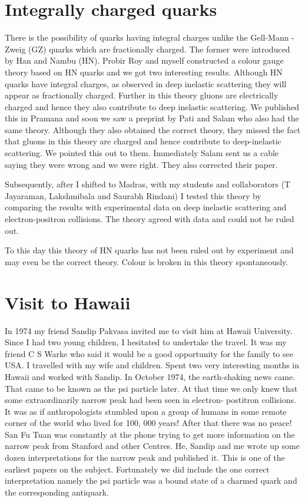 \section*{Integrally charged quarks}

There is the possibility of quarks having integral charges unlike the 
Gell-Mann - Zweig (GZ) quarks which are fractionally charged. The former 
were introduced by Han and Nambu (HN). Probir Roy and myself constructed 
a colour gauge theory based on HN quarks and we got two interesting 
results. Although HN quarks have integral charges, as observed in deep 
inelastic scattering they will appear as fractionally charged. Further 
in this theory gluons are electrically charged and hence they also 
contribute to deep inelastic scattering. We published this in Pramana 
and soon we saw a preprint by Pati and Salam who also had the same 
theory. Although they also obtained the correct theory, they missed the 
fact that gluons in this theory are charged and hence contribute to 
deep-inelastic scattering. We pointed this out to them. Immediately 
Salam sent us a cable saying they were wrong and we were right. They 
also corrected their paper.

Subsequently, after I shifted to Madras, with my students and 
collaborators (T Jayaraman, Lakshmibala and Saurabh Rindani) I tested 
this theory by comparing the results with experimental data on deep 
inelastic scattering and electron-positron collisions. The theory agreed 
with data and could not be ruled out.

To this day this theory of HN quarks has not been ruled out by 
experiment and may even be the correct theory. Colour is broken in this 
theory spontaneously.

\section*{Visit to Hawaii}

In 1974 my friend Sandip Pakvasa invited me to visit him at Hawaii 
University. Since I had two young children, I hesitated to undertake the 
travel. It was my friend C S Warke who said it would be a good 
opportunity for the family to see USA. I travelled with my wife and 
children. Spent two very interesting months in Hawaii and worked with 
Sandip. In October 1974, the earth-shaking news came. That came to be 
known as the psi particle later. At that time we only knew that some 
extraordinarily narrow peak had been seen in electron- postitron 
collisions. It was as if anthropologists stumbled upon a group of humans 
in some remote corner of the world who lived for 100, 000 years! After 
that there was no peace! San Fu Tuan was constantly at the phone trying 
to get more information on the narrow peak from Stanford and other 
Centres. He, Sandip and me wrote up some dozen interpretations for the 
narrow peak and published it. This is one of the earliest papers on the 
subject. Fortunately we did include the one correct interpretation 
namely the psi particle was a bound state of a charmed quark and the 
corresponding antiquark.

